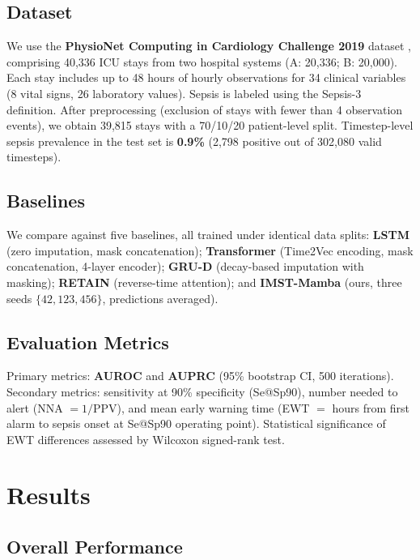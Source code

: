 \documentclass[twoside,11pt]{article}
\begin{document}
\subsection{Dataset}

We use the \textbf{PhysioNet Computing in Cardiology Challenge
2019} dataset \citep{reyna2020early}, comprising 40,336 ICU stays from two
hospital systems (A: 20,336; B: 20,000).  Each stay includes up to 48 hours of
hourly observations for 34 clinical variables (8 vital signs, 26 laboratory
values).  Sepsis is labeled using the Sepsis-3 definition.  After preprocessing
(exclusion of stays with fewer than 4 observation events), we obtain 39,815
stays with a 70/10/20 patient-level split.  Timestep-level sepsis prevalence
in the test set is \textbf{0.9\%} (2,798 positive out of 302,080 valid timesteps).

\subsection{Baselines}

We compare against five baselines, all trained under identical data splits:
\textbf{LSTM} (zero imputation, mask concatenation);
\textbf{Transformer} \citep{tipirneni2022selfsupervised} (Time2Vec encoding,
mask concatenation, 4-layer encoder);
\textbf{GRU-D} \citep{che2018gruD} (decay-based imputation with masking);
\textbf{RETAIN} \citep{choi2016retain} (reverse-time attention); and
\textbf{IMST-Mamba} (ours, three seeds $\{42, 123, 456\}$, predictions averaged).

\subsection{Evaluation Metrics}

Primary metrics: \textbf{AUROC} and \textbf{AUPRC} (95\% bootstrap CI, 500
iterations).  Secondary metrics: sensitivity at 90\% specificity (Se@Sp90),
number needed to alert (NNA $= 1/\text{PPV}$), and mean early warning time
(EWT $=$ hours from first alarm to sepsis onset at Se@Sp90 operating point).
Statistical significance of EWT differences assessed by Wilcoxon signed-rank
test.

\section{Results}
\label{sec:results}

\subsection{Overall Performance}
\end{document}
